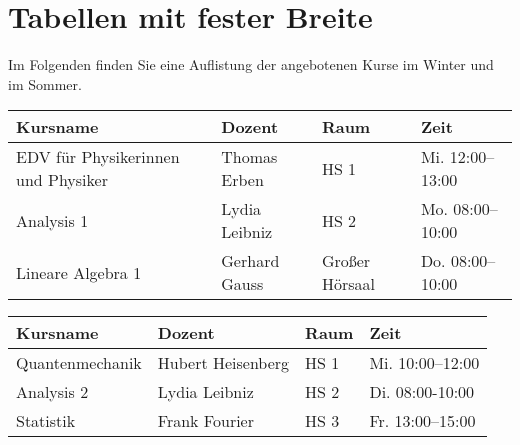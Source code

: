 \documentclass[12pt,a4paper]{scrartcl}
\begin{document}
  \section{Tabellen mit fester Breite}
  Im Folgenden finden Sie eine Auflistung der angebotenen Kurse im
  Winter und im Sommer.
  \begin{table}[htb]
    \centering
    \begin{tabularx}{\linewidth}{Xlll}
      \hline
      Kursname & Dozent & Raum & Zeit \\
      \hline
      EDV für Physikerinnen und Physiker & Thomas Erben & HS 1 &
        Mi. 12:00--13:00 \\
      Analysis 1 & Lydia Leibniz & HS 2 &
        Mo. 08:00--10:00 \\
      Lineare Algebra 1 & Gerhard Gauss &
        Großer Hörsaal & Do. 08:00--10:00\\
      \hline
    \end{tabularx}
  \end{table}
  \begin{table}[htb]
    \centering
    \begin{tabularx}{\linewidth}{XXll}
      \hline
      Kursname & Dozent & Raum & Zeit \\
      \hline
      Quantenmechanik & Hubert Heisenberg & HS 1 &
        Mi. 10:00--12:00 \\
      Analysis 2 & Lydia Leibniz & HS 2 &
        Di. 08:00-10:00 \\
      Statistik & Frank Fourier & HS 3 &
        Fr. 13:00--15:00 \\
      \hline
    \end{tabularx}
  \end{table}
\end{document}

